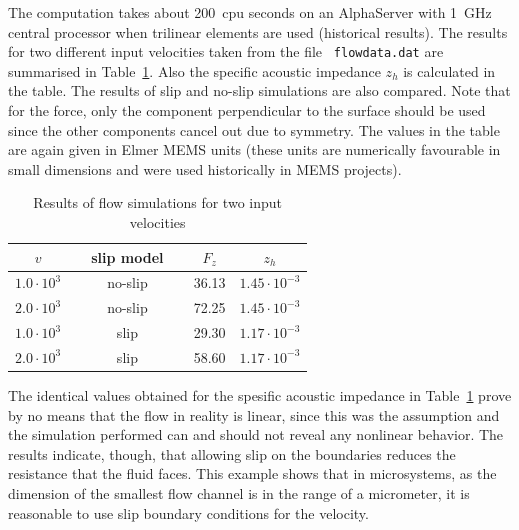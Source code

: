 The computation takes about 200~cpu seconds on an AlphaServer with
1~GHz central processor when trilinear elements are used (historical results).
The results
for two different input velocities taken from the file {\mbox{\tt
flowdata.dat}} are summarised in Table~\ref{tab:imped_res}. Also the
specific acoustic impedance $z_h$ is calculated in the table. The
results of slip and no-slip simulations are also compared.  Note that
for the force, only the component perpendicular to the surface should
be used since the other components cancel out due to symmetry. The
values in the table are again given in Elmer MEMS units (these units
are numerically favourable in small dimensions and were used historically
in MEMS projects).
\begin{table}[htb]
\caption{Results of flow simulations for two input velocities}
\label{tab:imped_res}
\begin{center}
\begin{tabular}{cccc} \hline
$v$ & \ \ slip model\ \  & $F_z$ & $z_h$ \\ \hline 
$1.0\cdot 10^3$   & no-slip  & 36.13  &  $1.45\cdot10^{-3}$ \\
$2.0\cdot 10^3$   & no-slip  & 72.25  &  $1.45\cdot10^{-3}$ \\ \hline
$1.0\cdot 10^3$   & slip     & 29.30  &  $1.17\cdot10^{-3}$ \\
$2.0\cdot 10^3$   & slip     & 58.60  &  $1.17\cdot10^{-3}$ \\ \hline
\end{tabular}
\end{center}
\end{table}

The identical values obtained for the spesific acoustic impedance in
Table~\ref{tab:imped_res} prove by no means that the flow in reality
is linear, since this was the assumption and the simulation performed
can and should not reveal any nonlinear behavior. The results
indicate, though, that allowing slip on the boundaries reduces the
resistance that the fluid faces. This example shows that in
microsystems, as the dimension of the smallest flow channel is in the
range of a micrometer, it is reasonable to use slip boundary
conditions for the velocity.

